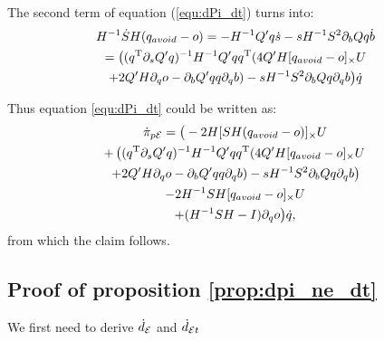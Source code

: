 \documentclass[journal]{IEEEtran}  %
\begin{document}
    The second term of equation (\ref{equ:dPi_dt}) turns into:
    \begin{multline}
      H^{-1}\dot S H (q_{avoid} - o)
      = - H^{-1} Q' q \dot s - s H^{-1} S^2 \partial_b Q q \dot b\\
      =   \big( (q^\mathrm{T} \partial_s Q' q)^{-1} H^{-1} Q' q q^\mathrm{T}  (4Q' H[q_{avoid} - o]_\times U  \\
      + 2Q' H\partial_q o - \partial_b Q' q q \partial_q b) -  s H^{-1} S^2 \partial_b Q q \partial_q b\big) \dot q\\
    \end{multline}

    Thus equation \eqref{equ:dPi_dt} could be written as:
    \begin{multline}
      \dot \pi_{p\mathcal{E}} = \big(-2 H [ SH(q_{avoid}-o)]_{\times}U   \\
      + \left( (q^\mathrm{T} \partial_s Q' q)^{-1} H^{-1} Q' q q^\mathrm{T}  (4Q' H[q_{avoid} - o]_\times U \right. \\
      \left.+ 2Q' H\partial_q o - \partial_b Q' q q \partial_q b) -  s H^{-1} S^2 \partial_b Q q \partial_q b\right) \\
      -2H^{-1} S H[q_{avoid}-o]_{\times} U  \\
      + (H^{-1}SH -I)\partial_q o \big) \dot q,
    \end{multline}
    from which the claim follows.
  
  \subsection{Proof of proposition \ref{prop:dpi_ne_dt}}\label{proof:dpi_ne_dt}
    We first need to derive $\dot{d}_{\mathcal{E}}$ and $\dot{d}_{\mathcal{E} t}$
\end{document}
